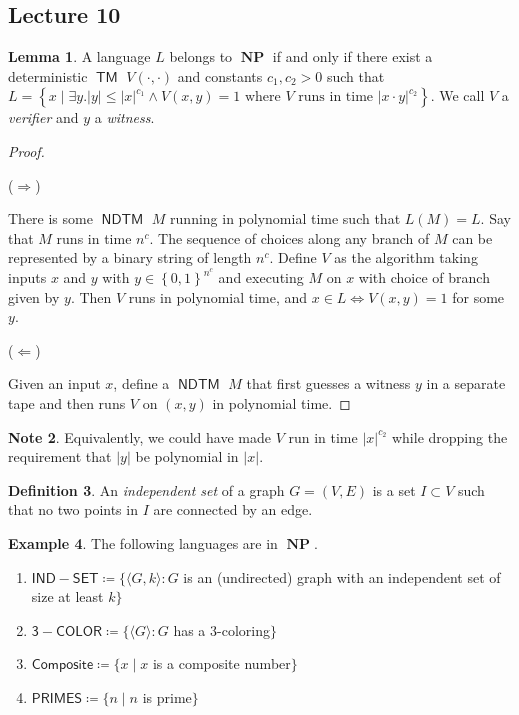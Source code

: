 \documentclass[10pt,letterpaper,cm]{nupset}
\theoremstyle{definition}
\newtheorem{definition}{Definition}[subsection]
\newtheorem{exmp}[definition]{Example}
\newtheorem{note}[definition]{Note}
\theoremstyle{theorem}
\newtheorem{lemma}[definition]{Lemma}
\theoremstyle{remark}
\newcommand{\1}{\mathbf{1}}
\newcommand{\0}{\vec 0}
\DeclareMathOperator{\TM}{\mathsf{TM}}
\DeclareMathOperator{\NP}{\mathbf{NP}}
\DeclareMathOperator{\NDTM}{\mathsf{NDTM}}
\begin{document}
\subsection{Lecture 10}

\begin{lemma}
A language $L$  belongs to $\NP$ if and only if there exist  a deterministic $\TM$ $V(\cdot, \cdot)$ and constants $c_1, c_2 >0$ such that $L = \left\{ x \mid \exists y.\lvert{y}\rvert \leq \lvert{x}\rvert^{c_1} \land V(x,y) = 1 \text{ where } V \text{ runs in time }\lvert{x\cdot y}\rvert^{c_2}\right\}$. We call $V$ a \textit{verifier} and $y$ a \textit{witness}.
\end{lemma}
\begin{proof} $ $

($\Longrightarrow$) 

\smallskip

There is some $\NDTM$ $M$ running in polynomial time such that $L(M) = L$. Say that $M$ runs in time $n^c$. The sequence of choices along any branch of $M$ can be represented by a binary string of length $n^c$.
Define $V$ as the algorithm taking inputs $x$ and $y$ with $y\in  \left\{0,1\right\}^{n^c}$ and executing $M$ on $x$ with choice of branch given by $y$. Then $V$ runs in polynomial time, and $x\in L \iff V(x,y) =1$ for some $y$.

\medskip


($\Longleftarrow$)  

\smallskip

Given an input $x$, define a $\NDTM$ $M$ that first guesses a witness $y$ in a separate tape and then runs $V$ on $(x,y)$ in polynomial time. 
\end{proof}

\begin{note}
Equivalently, we could have made $V$ run in time $\lvert{x}\rvert^{c_2}$ while dropping the requirement that $\lvert{y}\rvert$ be polynomial in $\lvert{x}\rvert$. 
\end{note}

\begin{definition}
An \textit{independent set} of a graph $G=\left(V, E\right)$ is a set $I\subset V$ such that no two points in $I$ are connected by an edge. 
\end{definition}

\begin{exmp} The following languages are in $\NP$.
\begin{enumerate}
\item $\mathsf{IND{-}SET} \coloneqq \{\langle G, k \rangle : G$ is an (undirected) graph with an independent set of size at least $k\}$
\item $\mathsf{3{-}COLOR}\coloneqq \{ \langle G \rangle : G$ has a $3$-coloring$\}$
\item $\mathsf{Composite} \coloneqq \{x \mid x$ is a composite number$\}$
\item $\mathsf{PRIMES}\coloneqq \{ n \mid n$ is prime$\}$
\end{enumerate}
\end{exmp}
\end{document}
